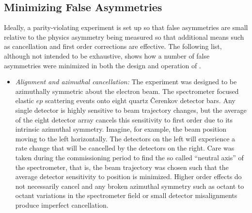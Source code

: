 \subsection{Minimizing False Asymmetries}
Ideally, a parity-violating  experiment is set up so that false asymmetries are small relative to the physics asymmetry being measured so that additional means such as cancellation and first order corrections are effective. The following list, although not intended to be exhaustive, shows how a number of false asymmetries were minimized in both the design and operation of \Q.  
\begin{itemize}
\item {\it Alignment and azimuthal cancellation:} The \Qs experiment was designed to be azimuthally symmetric about the electron beam. The \qtor spectrometer focused elastic $ep$ scattering events onto eight quartz \v Cerenkov detector bars. Any single detector is highly sensitive to beam trajectory changes, but the average of the eight detector array cancels this sensitivity to first order due to its intrinsic azimuthal symmetry. Imagine, for example, the beam position moving to the left horizontally. The detectors on the left will experience a rate change that will be cancelled by the detectors on the right. Care was taken during the \Qs commissioning period to find the so called ``neutral axis'' of the \qtor spectrometer, that is, the beam trajectory was chosen such that the average detector sensitivity to position is minimized. Higher order effects do not necessarily cancel and any broken azimuthal symmetry such as octant to octant variations in the spectrometer field or small detector misalignments produce imperfect cancellation. 


\end{itemize}
